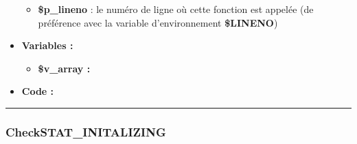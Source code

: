 \documentclass[a4paper,10pt]{article}
\begin{document}
\begin{itemize}
\begin{itemize}
        \item \color{orange}\textbf{\$p\_lineno}\color{white} : le numéro de ligne où cette fonction est appelée (de préférence avec la variable d'environnement \textbf{\color{orange}\$LINENO})\\[1\baselineskip]
    \end{itemize}

    \item \textbf{Variables :}
    \begin{itemize}
        \item \textbf{\color{orange}\$v\_array\color{white} :}\\[1\baselineskip]
    \end{itemize}

    \item \textbf{Code :}
\end{itemize}


\color{blue}\par\noindent\rule{\textwidth}{0.4pt}\color{white}

\color{blue}
\subsubsection{CheckSTAT\_INITALIZING}\color{white}
\end{document}
